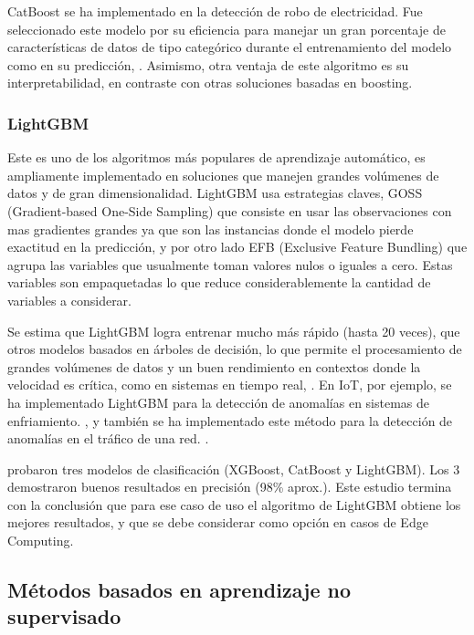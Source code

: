 \documentclass[11pt,a4paper,spanish]{book}
\numberwithin{equation}{chapter}
\numberwithin{figure}{chapter}
\begin{document}
CatBoost se ha implementado en la detección de robo de electricidad. Fue seleccionado 
este modelo por su eficiencia para manejar un gran porcentaje de características de 
datos de tipo categórico durante el entrenamiento del modelo como en su predicción, 
\cite{hussain2021catboost}. Asimismo, otra ventaja de este algoritmo es su 
interpretabilidad, en contraste con otras soluciones basadas en boosting. 


\subsubsection{LightGBM}


Este es uno de los algoritmos más populares de aprendizaje automático, es ampliamente 
implementado en soluciones que manejen grandes volúmenes de datos y de gran 
dimensionalidad. LightGBM usa estrategias claves, GOSS 
(Gradient-based One-Side Sampling) que consiste en usar las observaciones con mas 
gradientes grandes ya que son las instancias donde el modelo pierde exactitud en la 
predicción, y por otro lado EFB (Exclusive Feature Bundling) que agrupa las variables 
que usualmente toman valores nulos o iguales a cero. Estas variables son empaquetadas 
lo que reduce considerablemente la cantidad de variables a considerar.


Se estima que LightGBM logra entrenar mucho más rápido (hasta 20 veces), que otros 
modelos basados en árboles de decisión, lo que permite el procesamiento de grandes 
volúmenes de datos y un buen rendimiento en contextos donde la velocidad es crítica, 
como en sistemas en tiempo real, \cite{ke2017lightgbm}. En IoT, por ejemplo, se ha 
implementado LightGBM para la detección de anomalías en sistemas de enfriamiento. 
\cite{yanabe2020lightgbm}, y también se ha implementado este método para la detección 
de anomalías en el tráfico de una red. \cite{islam2020lightgbm}. 


\cite{delasmorenas2025bearing} probaron tres modelos de clasificación 
(XGBoost, CatBoost y LightGBM). Los 3 demostraron buenos resultados en 
precisión (98\% aprox.). Este estudio termina con la conclusión que para ese caso de 
uso el algoritmo de LightGBM obtiene los mejores resultados, y que se debe considerar 
como opción en casos de Edge Computing.


\subsection{Métodos basados en aprendizaje no supervisado}
\end{document}
